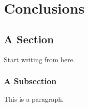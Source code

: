 \chapter{Conclusions}
\section{A Section}
Start writing from here.
\subsection{A Subsection}
This is a paragraph.